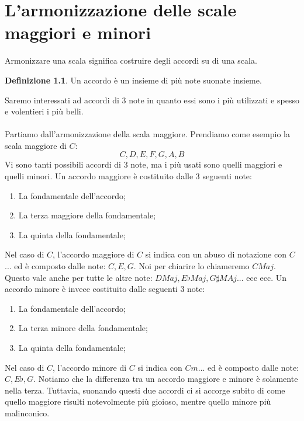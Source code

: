 \documentclass[12pt,a4paper]{report}
\theoremstyle{definition}
\newtheorem{Def}{Definizione}[chapter]
\theoremstyle{Theorem}
\theoremstyle{definition}
\theoremstyle{definition}
\theoremstyle{definition}
\begin{document}
	 		\chapter{L'armonizzazione delle scale maggiori e minori}
	 		Armonizzare una scala significa costruire degli accordi su di una scala.
	 		\begin{Def}
	 			Un accordo è un insieme di più note suonate insieme.
	 		\end{Def}
	 		Saremo interessati ad accordi di $3$ note in quanto essi sono i più utilizzati e spesso e volentieri i più belli.\\
	 		\\
	 		Partiamo dall'armonizzazione della scala maggiore.
	 		Prendiamo come esempio la scala maggiore di $C$:
	 		$$C,D,E,F,G,A,B$$
	 		Vi sono tanti possibili accordi di 3 note, ma i più usati sono quelli maggiori e quelli minori. Un accordo maggiore è costituito dalle 3 seguenti note: 
	 		\begin{enumerate}
	 			\item La fondamentale dell'accordo;\\
	 			\item La terza maggiore della fondamentale;\\
	 			\item La quinta della fondamentale;\\
	 		\end{enumerate}
	 		Nel caso di $C$, l'accordo maggiore di $C$ si indica con un abuso di notazione con $C$... ed è composto dalle note: $C,E,G$. Noi per chiarire lo chiameremo $CMaj$. Questo vale anche per tutte le altre note: $DMaj, E\flat Maj,G\sharp MAj...$ ecc ecc.
	 		Un accordo minore è invece costituito dalle seguenti 3 note:
	 		\begin{enumerate}
	 			\item La fondamentale dell'accordo;\\
	 			\item La terza minore della fondamentale;\\
	 			\item La quinta della fondamentale;\\
	 		\end{enumerate}
	 		Nel caso di $C$, l'accordo minore di $C$ si indica con $Cm$... ed è composto dalle note: $C,E\flat,G$.
	 		Notiamo che la differenza tra un accordo maggiore e minore è solamente nella terza. Tuttavia, suonando questi due accordi ci si accorge subito di come quello maggiore risulti notevolmente più gioioso, mentre quello minore più malinconico.
\end{document}
